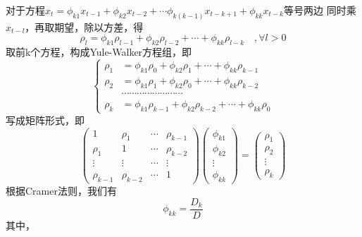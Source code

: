 \documentclass[12pt, a4paper, oneside]{ctexbook}
\begin{document}
对于方程$x_{t}=\phi_{k1}x_{t-1}+\phi_{k2}x_{t-2}+\cdots\phi_{k(k-1)}x_{t-k+1}+\phi_{kk}x_{t-k}$等号两边
同时乘$x_{t-l}$，再取期望，除以方差，得
\begin{equation*}
    \rho_l=\phi_{k1}\rho_{l-1}+\phi_{k2}\rho_{l-2}+\cdots+\phi_{kk}\rho_{l-k}\quad,\forall l>0
\end{equation*}
取前k个方程，构成Yule-Walker方程组，即
\begin{equation}
    \left.\left\{\begin{aligned}
        \rho_1 & =\phi_{k1}\rho_0+\phi_{k2}\rho_1+\cdots+\phi_{kk}\rho_{k-1}     \\
        \rho_2 & =\phi_{k1}\rho_1+\phi_{k2}\rho_0+\cdots+\phi_{kk}\rho_{k-2}     \\
               & \cdots\cdots\cdots\cdots\cdots\cdots\cdots\cdots                \\
        \rho_k & =\phi_{k1}\rho_{k-1}+\phi_{k2}\rho_{k-2}+\cdots+\phi_{kk}\rho_0
    \end{aligned}\right.\right.
\end{equation}
写成矩阵形式，即
\begin{equation}
    \left.\left(
    \begin{matrix}
        1          & \rho_1     & \cdots & \rho_{k-1} \\
        \rho_1     & 1          & \cdots & \rho_{k-2} \\
        \vdots     & \vdots     & \cdots & \vdots     \\
        \rho_{k-1} & \rho_{k-2} & \cdots & 1
    \end{matrix}\right.\right)
    \left(\begin{matrix}
        \phi_{k1} \\
        \phi_{k2} \\
        \vdots    \\
        \phi_{kk}
    \end{matrix}\right)
    =\left(\begin{matrix}
        \rho_1 \\\rho_2\\\vdots\\\rho_k
    \end{matrix}\right)
\end{equation}
根据Cramer法则，我们有
\begin{equation}
    \phi_{kk}=\frac{D_k}D
\end{equation}
其中，
\end{document}
